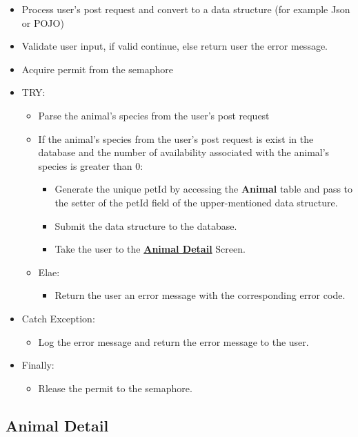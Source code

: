 \documentclass[a4paper]{article}
\begin{document}
\begin{itemize}
	\item Process user's post request and convert to a data structure (for example Json or POJO)
	\item Validate user input, if valid continue, else return user the error message.
	\item Acquire permit from the semaphore
	\item TRY:
	\begin{itemize}

	\item Parse the animal's species from the user's post request
	\item If the animal's species from the user's post request is exist in the database and the number of availability associated with the animal's species is greater than 0:
		\begin{itemize}
			\item Generate the unique petId by accessing the \textbf{Animal} table and pass to the setter of the petId field of the upper-mentioned data structure.
			\item Submit the data structure to the database.
			\item Take the user to the \underline{\textbf{Animal Detail}} Screen.
		\end{itemize}
	\item Elae:
		\begin{itemize}
			\item Return the user an error message with the corresponding error code.
		\end{itemize}

	\end{itemize}
	\item Catch Exception:
		\begin{itemize}
		\item Log the error message and return the error message to the user.
		\end{itemize}
	\item Finally:
		\begin{itemize}
		\item Rlease the permit to the semaphore.
		\end{itemize}
\end{itemize}


\hypertarget{animal_detail}{\subsection{Animal Detail}}
\end{document}
